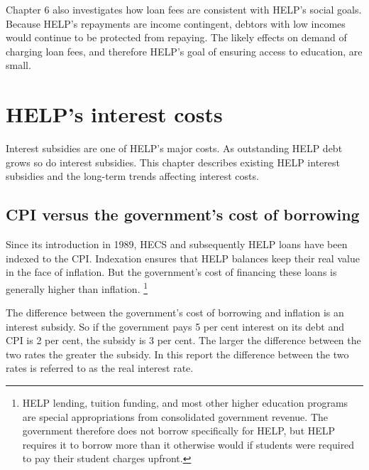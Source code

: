 \documentclass[embargoed]{grattan}
\begin{document}
Chapter 6 also investigates how loan fees are consistent with HELP's social goals.
Because HELP's repayments are income contingent, debtors with low incomes would continue to be protected from repaying.
The likely effects on demand of charging loan fees, and therefore HELP's goal of ensuring access to education, are small.

\chapter{HELP's interest costs}\label{chap:helps-interest-costs}

Interest subsidies are one of HELP's major costs.
As outstanding HELP debt grows so do interest subsidies.
This chapter describes existing HELP interest subsidies and the long-term trends affecting interest costs.

\section[CPI versus the government's cost of borrowing]{\gls{CPI} versus the government's cost of borrowing}\label{cpi-versus-the-governments-cost-of-borrowing}

\protect\hypertarget{_Ref332899615}{}{\protect\hypertarget{_Ref332978906}{}{}}Since its introduction in 1989, HECS and subsequently HELP loans have been indexed to the \gls{CPI}.
Indexation ensures that HELP balances keep their real value in the face of inflation.
But the government's cost of financing these loans is generally higher than inflation.%
\footnote{HELP lending, tuition funding, and most other higher education programs are special appropriations from consolidated government revenue.
The government therefore does not borrow specifically for HELP, but HELP requires it to borrow more than it otherwise would if students were required to pay their student charges upfront.}

The difference between the government's cost of borrowing and inflation is an interest subsidy.
So if the government pays 5 per cent interest on its debt and \gls{CPI} is 2 per cent, the subsidy is 3 per cent.
The larger the difference between the two rates the greater the subsidy.
In this report the difference between the two rates is referred to as the real interest rate.
\end{document}
